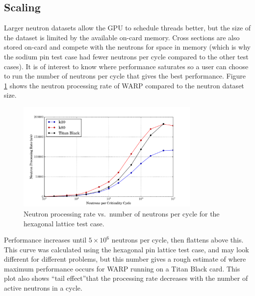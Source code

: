 \documentclass[preprint,12pt]{elsarticle}
\begin{document}
\subsection{Scaling}

Larger neutron datasets allow the GPU to schedule threads better, but the size of the dataset is limited by the available on-card memory.  Cross sections are also stored on-card and compete with the neutrons for space in memory (which is why the sodium pin test case had fewer neutrons per cycle compared to the other test cases).  It is of interest to know where performance saturates so a user can choose to run the number of neutrons per cycle that gives the best performance.  Figure \ref{scaling} shows the neutron processing rate of WARP compared to the neutron dataset size.

\begin{figure}[h!]
\centering
\includegraphics[width=0.8\textwidth,trim= 1cm 0cm 1cm 0cm]{graphics/scaling.pdf}
\caption{Neutron processing rate vs.\ number of neutrons per cycle for the hexagonal lattice test case. \label{scaling} }
\end{figure}

Performance increases until $5\times10^6$ neutrons per cycle, then flattens above this.  This curve was calculated using the hexagonal pin lattice test case, and may look different for different problems, but this number gives a rough estimate of where maximum performance occurs for WARP running on a Titan Black card.  This plot also shows ``tail effect''\textemdash that the processing rate decreases with the number of active neutrons in a cycle.  
\end{document}
